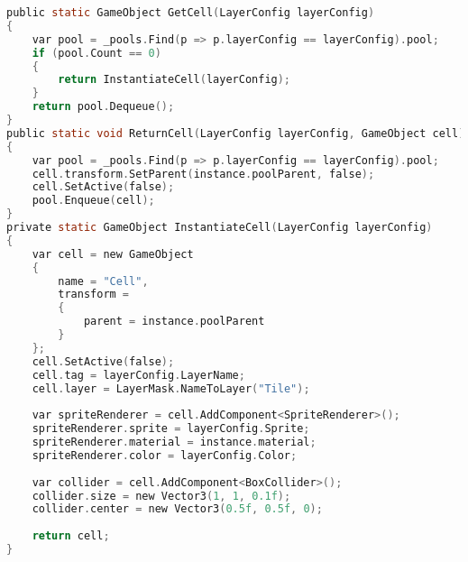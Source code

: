 \begin{lstlisting}[language={C},label=lst:pooling,caption={Metody do pobnierania i zwracanie obiektów z puli
oraz inicjalizacji komórek.}]
public static GameObject GetCell(LayerConfig layerConfig)
{
    var pool = _pools.Find(p => p.layerConfig == layerConfig).pool;
    if (pool.Count == 0)
    {
        return InstantiateCell(layerConfig);
    }
    return pool.Dequeue();
}
public static void ReturnCell(LayerConfig layerConfig, GameObject cell)
{
    var pool = _pools.Find(p => p.layerConfig == layerConfig).pool;
    cell.transform.SetParent(instance.poolParent, false);
    cell.SetActive(false);
    pool.Enqueue(cell);
}
private static GameObject InstantiateCell(LayerConfig layerConfig)
{
    var cell = new GameObject
    {
        name = "Cell",
        transform =
        {
            parent = instance.poolParent
        }
    };
    cell.SetActive(false);
    cell.tag = layerConfig.LayerName;
    cell.layer = LayerMask.NameToLayer("Tile");
        
    var spriteRenderer = cell.AddComponent<SpriteRenderer>();
    spriteRenderer.sprite = layerConfig.Sprite;
    spriteRenderer.material = instance.material;
    spriteRenderer.color = layerConfig.Color;
    
    var collider = cell.AddComponent<BoxCollider>();
    collider.size = new Vector3(1, 1, 0.1f);
    collider.center = new Vector3(0.5f, 0.5f, 0);
        
    return cell;
}
\end{lstlisting}